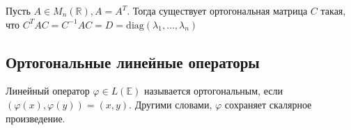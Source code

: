 \begin{Consequence}
	Пусть $A\in M_n(\mathbb{R}), A = A^T$. Тогда существует ортогональная матрица $C$ такая, что $C^TAC = C^{-1} AC = D = \mathrm{diag}(\lambda_1, \ldots, \lambda_n)$
\end{Consequence}

\subsection{Ортогональные линейные операторы}

\begin{Def}
	Линейный оператор $\varphi \in L(\mathbb{E})$ называется ортогональным, если $(\varphi(x), \varphi(y)) = (x,y)$. Другими словами, $\varphi$ сохраняет скалярное произведение.
\end{Def}

